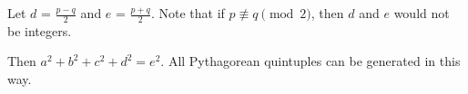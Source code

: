 \documentclass[12pt,table]{article}
\theoremstyle{definition}
\newtheorem{example}[theorem]{Example}
\theoremstyle{remark}
\newcommand{\fix}[1]{\todo[inline]{#1}}
\numberwithin{equation}{section}
\begin{document}
\begin{appendices}
\begin{itemize}
\end{itemize}




Let $d$ = $\frac{p-q}{2}$ and
$e$ = $\frac{p+q}{2}$. 
Note that if $p \not\equiv q \pmod 2$, then $d$ and $e$
would not be integers.

Then $a^2 + b^2 + c^2 + d^2 = e^2$. All Pythagorean quintuples can 
be generated in this way.


\begin{comment}

\fix{I (as of June 27 2019) believe the Heinz 57 result resulted from
an error in my computer code. I am also suspicious of the other table
in this section, and I don't see how it is directly relevant.}

\section{Testing the formulas from Theorem~\ref{theorem_as_products}}
\label{appendix_C}






The author wrote
a Python program
to test how many Pythagorean quintuples does Theorem~\ref{theorem_as_products}
represent.
This program found all primitive Pythagorean 
quintuples with all legs less than or equal to $20$.
The program then takes a form, applies it
to a set of four integers or half integers, and records the resulting 
Pythagorean quintuple.   


\begin{example}
Example of a generating list: 
$$ 4, 4, 0, 1
$$ 
Example of a form:
$$
     (x+yi+zj+wk)(y+zi+wj-xk)
$$
The program applies the form: 
$$
     (4+4i+0j+1k)(4+0i+1j-4k)=20+15i+20j-8k
$$
The result:
$$
       8, 15, 20, 20
$$
The result is always a Pythagorean quintuple: 
$$8^2+ 15^2+ 20^2+ 20^2= 33^2$$
\end{example}






\end{comment}
\end{appendices}
\end{document}
